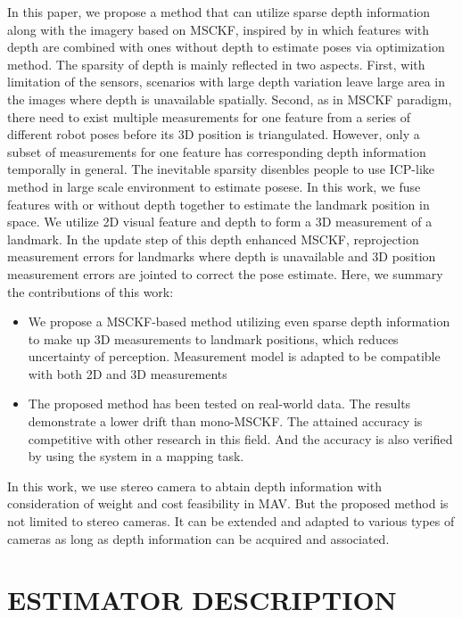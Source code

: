 \documentclass[a4paper, 10pt, conference]{ieeeconf}      %
\begin{document}
In this paper, we propose a method that can utilize sparse depth information along with the imagery based on MSCKF, inspired by \cite{zhang2014real} in which features with depth are combined with ones without depth to estimate poses via optimization method. The sparsity of depth is mainly reflected in two aspects. First, with limitation of the sensors, scenarios with large depth variation leave large area in the images where depth is unavailable spatially. Second, as in MSCKF paradigm, there need to exist multiple measurements for one feature from a series of different robot poses before its 3D position is triangulated. However, only a subset  of measurements for one feature has corresponding depth information temporally in general. The inevitable sparsity disenbles people to use ICP-like method in large scale environment to estimate posese. In this work, we fuse features with or without depth together to estimate the landmark position in space. We utilize 2D visual feature and depth to form a 3D measurement of a landmark. In the update step of this depth enhanced MSCKF, reprojection measurement errors for landmarks where depth is unavailable and 3D position measurement errors are jointed to correct the pose estimate. Here, we summary the contributions of this work:
  
\begin{itemize}
	\item {We propose a  MSCKF-based method  utilizing even sparse depth information to make up 3D measurements to  landmark positions, which reduces uncertainty of perception. Measurement model is adapted to be compatible with both 2D and 3D measurements  }
	
	\item {The proposed method has been tested on real-world data. The results demonstrate a lower drift than mono-MSCKF. The attained accuracy is  competitive with other research in this field. And the accuracy is also  verified by using the system in a mapping task.}
\end{itemize}

In this work, we use stereo camera to abtain depth information with consideration of weight and cost feasibility in MAV. But the proposed method is not limited to stereo cameras. It can be extended and adapted to various types of cameras as long as depth information can be acquired and associated.




\section{ESTIMATOR DESCRIPTION}
\end{document}
